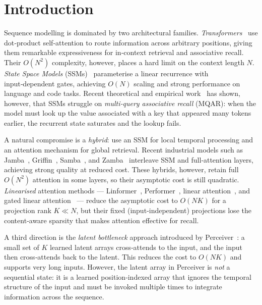 \documentclass[10pt,twocolumn,letterpaper]{article}
\begin{document}
\section{Introduction}
\label{sec:intro}

Sequence modelling is dominated by two architectural families.  \emph{Transformers}~\cite{vaswani2017attention} use dot‑product self‑attention to route information across arbitrary positions, giving them remarkable expressiveness for in‑context retrieval and associative recall.  Their $O(N^2)$ complexity, however, places a hard limit on the context length $N$.  \emph{State Space Models} (SSMs)~\cite{gu2022efficiently,gu2023mamba,dao2024transformers} parameterise a linear recurrence with input‑dependent gates, achieving $O(N)$ scaling and strong performance on language and code tasks.  Recent theoretical and empirical work~\cite{arora2024theoretical,arora2023simple} has shown, however, that SSMs struggle on \emph{multi‑query associative recall} (MQAR): when the model must look up the value associated with a key that appeared many tokens earlier, the recurrent state saturates and the lookup fails.

A natural compromise is a \emph{hybrid}: use an SSM for local temporal processing and an attention mechanism for global retrieval.  Recent industrial models such as Jamba~\cite{anthony2024jamba}, Griffin~\cite{de2024griffin}, Samba~\cite{ren2024samba}, and Zamba~\cite{zoq2024zamba} interleave SSM and full‑attention layers, achieving strong quality at reduced cost.  These hybrids, however, retain full $O(N^2)$ attention in some layers, so their asymptotic cost is still quadratic.  \emph{Linearised} attention methods — Linformer~\cite{wang2020linformer}, Performer~\cite{choromanski2020rethinking}, linear attention~\cite{katharopoulos2020transformers}, and gated linear attention~\cite{yang2024gated} — reduce the asymptotic cost to $O(NK)$ for a projection rank $K\!\ll\!N$, but their fixed (input‑independent) projections lose the content‑aware sparsity that makes attention effective for recall.

A third direction is the \emph{latent bottleneck} approach introduced by Perceiver~\cite{jaegle2021perceiver,jaegle2021perceiverio}: a small set of $K$ learned latent arrays cross‑attends to the input, and the input then cross‑attends back to the latent.  This reduces the cost to $O(NK)$ and supports very long inputs.  However, the latent array in Perceiver is \emph{not} a sequential state: it is a learned position‑indexed array that ignores the temporal structure of the input and must be invoked multiple times to integrate information across the sequence.
\end{document}
